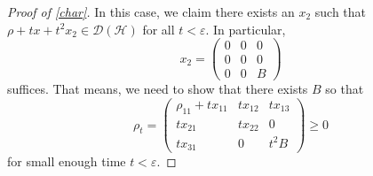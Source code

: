 \documentclass[11pt,reqno]{amsart}
\theoremstyle{definition}
\newcommand{\mc}{\mathcal}
\begin{document}
\begin{proof}[Proof of \cref{char}]
    In this case, we claim there exists an $x_2$ such that $\rho+tx+t^2x_2\in \mc D(\mc{H})$ for all $t<\varepsilon$. In particular, 
    $$x_2=\begin{pmatrix}
        0 & 0 & 0\\
        0 & 0 & 0\\
        0 & 0 & B
    \end{pmatrix}$$ suffices. That means, we need to show that there exists $B$ so that
    $$\rho_t=\begin{pmatrix}
        \rho_{11}+tx_{11} & tx_{12} & tx_{13}\\
        tx_{21} & tx_{22} & 0\\
        tx_{31} & 0 & t^2B
    \end{pmatrix}\geq 0$$
    for small enough time $t<\varepsilon$.


\end{proof}
\end{document}
